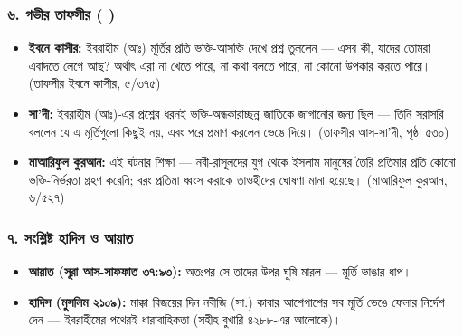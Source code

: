 \subsubsection*{৬. গভীর তাফসীর ( )}

\begin{itemize}
\item \textbf{ইবনে কাসীর:} ইবরাহীম (আঃ) মূর্তির প্রতি ভক্তি-আসক্তি দেখে প্রশ্ন তুললেন — এসব কী, যাদের তোমরা এবাদতে লেগে আছ? অর্থাৎ এরা না খেতে পারে, না কথা বলতে পারে, না কোনো উপকার করতে পারে। (তাফসীর ইবনে কাসীর, ৫/৩৭৫)
\item \textbf{সা'দী:} ইবরাহীম (আঃ)-এর প্রশ্নের ধরনই ভক্তি-অন্ধকারাচ্ছন্ন জাতিকে জাগানোর জন্য ছিল — তিনি সরাসরি বললেন যে এ মূর্তিগুলো কিছুই নয়, এবং পরে প্রমাণ করলেন ভেঙে দিয়ে। (তাফসীর আস-সা'দী, পৃষ্ঠা ৫৩০)
\item \textbf{মাআরিফুল কুরআন:} এই ঘটনার শিক্ষা — নবী-রাসূলদের যুগ থেকে ইসলাম মানুষের তৈরি প্রতিমার প্রতি কোনো ভক্তি-নির্ভরতা গ্রহণ করেনি; বরং প্রতিমা ধ্বংস করাকে তাওহীদের ঘোষণা মানা হয়েছে। (মাআরিফুল কুরআন, ৬/৫২৭)
\end{itemize}
\subsubsection*{৭. সংশ্লিষ্ট হাদিস ও আয়াত}

\begin{itemize}
\item \textbf{আয়াত (সূরা আস-সাফফাত ৩৭:৯৩):} অতঃপর সে তাদের উপর ঘুষি মারল — মূর্তি ভাঙার ধাপ।
\item \textbf{হাদিস (মুসলিম ২১০৯):} মাক্কা বিজয়ের দিন নবীজি (সা.) কাবার আশেপাশের সব মূর্তি ভেঙে ফেলার নির্দেশ দেন — ইবরাহীমের পথেরই ধারাবাহিকতা (সহীহ বুখারি ৪২৮৮-এর আলোকে)।
\end{itemize}


